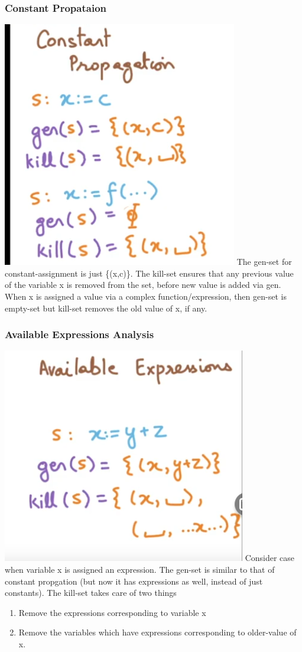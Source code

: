 \subsubsection{Constant Propataion}
\includegraphics[scale=0.5]{images/89_1.png}
\newline 
The gen-set for constant-assignment is just \{(x,c)\}. The kill-set ensures that any previous value of the variable x is removed from the set, before new value is added via gen.
When x is assigned a value via a complex function/expression, then gen-set is empty-set but kill-set removes the old value of x, if any.
\subsubsection{Available Expressions Analysis}
\includegraphics[scale=0.5]{images/89_2.png}
\newline 
Consider case when variable x is assigned an expression. The gen-set is similar to that of constant propgation (but now it has expressions as well, instead of just constants). The kill-set takes care of two things 
\begin{enumerate}
    \item Remove the expressions corresponding to variable x 
    \item Remove the variables which have expressions corresponding to older-value of x.
\end{enumerate}


